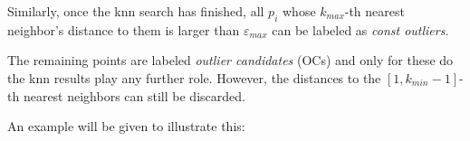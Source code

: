 \documentclass[runningheads]{llncs}
\begin{document}
    Similarly, once the knn search has finished, all $p_i$ whose $k_{max}$-th nearest neighbor's distance to them is larger than $\varepsilon_{max}$ can be labeled as \emph{const outliers}.

    The remaining points are labeled \emph{outlier candidates} (OCs) and only for these do the knn results play any further role. However, the distances to the $[1,k_{min}-1]$-th nearest neighbors can still be discarded.

    An example will be given to illustrate this:

%
%


  
\end{document}
